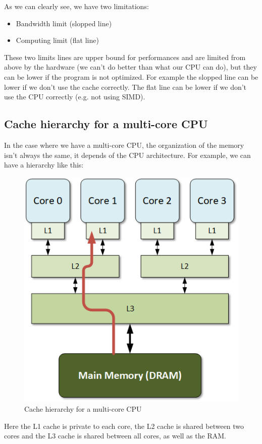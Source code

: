 \documentclass[12pt, openany]{report}
\theoremstyle{definition}
\begin{document}
As we can clearly see, we have two limitations:
\begin{itemize}
	\item Bandwidth limit (slopped line)
	\item Computing limit (flat line)
\end{itemize}
These two limits lines are upper bound for performances and are limited from above by the hardware (we can't do better than what our CPU can do), but they can be lower if the program is not optimized. For example the slopped line can be lower if we don't use the cache correctly. The flat line can be lower if we don't use the CPU correctly (e.g. not using SIMD).\\
\newpage
\subsection{Cache hierarchy for a multi-core CPU}
In the case where we have a multi-core CPU, the organization of the memory isn't always the same, it depends of the CPU architecture. For example, we can have a hierarchy like this:
\begin{figure}[H]
	\centering
	\includegraphics[scale=0.5]{img/multicore-cache.png}
	\caption{Cache hierarchy for a multi-core CPU}
	\label{fig:multi_core_cache}
\end{figure}
Here the L1 cache is private to each core, the L2 cache is shared between two cores and the L3 cache is shared between all cores, as well as the RAM. 
\end{document}
